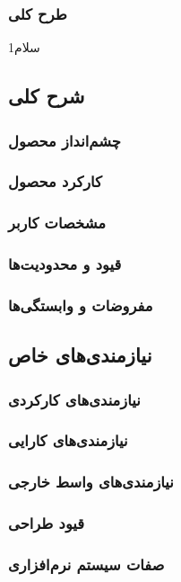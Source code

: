 \documentclass[12pt]{article}
\begin{document}
	\subsubsection{طرح کلی}
	سلام1

	\subsection{شرح کلی}
	\subsubsection{چشم‌انداز محصول}
	\subsubsection{کارکرد محصول}
	\subsubsection{مشخصات کاربر}
	\subsubsection{قیود و محدودیت‌ها}
	\subsubsection{مفروضات و وابستگی‌ها}

	\subsection{نیازمندی‌های خاص}
	\subsubsection{نیازمندی‌های کارکردی}
	\subsubsection{نیازمندی‌های کارایی}
	\subsubsection{نیازمندی‌های واسط خارجی}
	\subsubsection{قیود طراحی}
	\subsubsection{صفات سیستم نرم‌افزاری}
\end{document}
